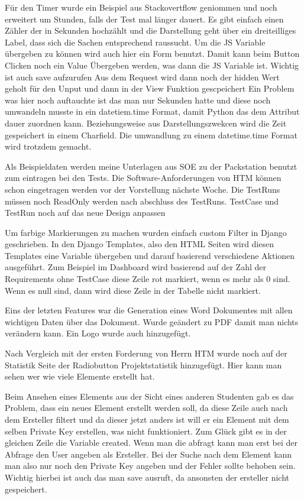 \documentclass[11pt,a4paper]{report}
\begin{document}
Für den Timer wurde ein Beispiel aus Stackovertflow geniommen und noch erweitert um Stunden, falls der Test mal länger dauert. Es gibt einfach einen Zähler der in Sekunden hochzählt und die Darstellung geht über ein dreiteilliges Label, dass sich die Sachen entsprechend raussucht. 
Um die JS Variable übergeben zu können wird auch hier ein Form benutzt. Damit kann beim Button Clicken noch ein Value Übergeben werden, was dann die JS Variable ist. Wichtig ist auch save aufzurufen
Aus dem Request wird dann noch der hidden Wert geholt für den Unput und dann in der View Funktion gescpeichert
Ein Problem was hier noch auftauchte ist das man nur Sekunden hatte und diese noch umwandeln musste in ein datetiem.time Format, damit Python das dem Attribut dauer zuordnen kann.
Beziehungsweise aus Darstellungszwekcen wird die Zeit gespeichert in einem Charfield. Die umwandlung zu einem datetime.time Format wird trotzdem gemacht.


Als Beispieldaten werden meine Unterlagen aus SOE zu der Packstation benutzt zum eintragen bei den Tests.
Die Software-Anforderungen von HTM können schon eingetragen werden vor der Vorstellung nächste Woche. 
Die TestRuns müssen noch ReadOnly werden nach abschluss des TestRuns.
TestCase und TestRun noch auf das neue Design anpassen


Um farbige Markierungen zu machen wurden einfach custom Filter in Django geschrieben. In den Django Templates, also den HTML Seiten wird diesen Templates eine Variable übergeben und darauf basierend verschiedene Aktionen ausgeführt. Zum Beispiel im Dashboard wird basierend auf der Zahl der Requirements ohne TestCase diese Zeile rot markiert, wenn es mehr als 0 sind. Wenn es null sind, dann wird diese Zeile in der Tabelle nicht markiert.

Eins der letzten Features war die Generation eines Word Dokumentes mit allen wichtigen Daten über das Dokument.  Wurde geändert zu PDF damit man nichts verändern kann. Ein Logo wurde auch hinzugefügt. 

Nach Vergleich mit der ersten Forderung von Herrn HTM wurde noch auf der Statistik Seite der Radiobutton Projektstatistik hinzugefügt. Hier kann man sehen wer wie viele Elemente erstellt hat.


Beim Ansehen eines Elements aus der Sicht eines anderen Studenten gab es das Problem, dass ein neues Element erstellt werden soll, da diese Zeile auch nach dem Ersteller filtert und da dieser jetzt anders ist will er ein Element mit dem selben Private Key erstellen, was nicht funktioniert. Zum Glück gibt es in der gleichen Zeile die Variable created. Wenn man die abfragt kann man erst bei der Abfrage den User angeben als Ersteller. Bei der Suche nach dem Element kann man also nur noch den Private Key angeben und der Fehler sollte behoben sein.
Wichtig hierbei ist auch das man save ausruft, da ansonsten der ersteller nicht gespeichert.
\end{document}
